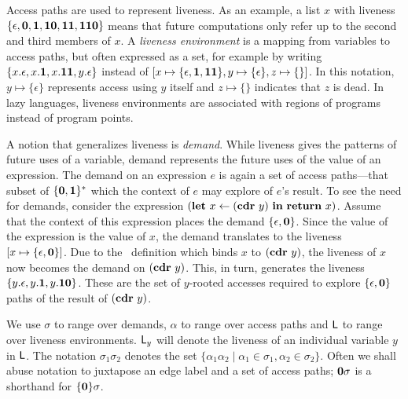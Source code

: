 \documentclass[preprint, 9pt]{sigplanconf}
\begin{document}
Access paths are used to  represent liveness. As an example, a list
$x$ with 
liveness  $\{\epsilon,  \mathbf{0},  \mathbf{1},  \mathbf{1}\mathbf{0},
\mathbf{1}\mathbf{1},  \mathbf{1}\mathbf{1}\mathbf{0}\}$ means that future computations    only
refer up  to the  second and  third members of  $x$.  A  {\em liveness
  environment} is a mapping from  variables to access paths, but often
expressed as  a set,  for example  by writing  $\{x.\epsilon, x.\mathbf{1},
x.\mathbf{1}\mathbf{1},        y.\epsilon\}$        instead        of        $[x
  \mapsto\{\epsilon,\mathbf{1},\mathbf{1}\mathbf{1}\},          y\mapsto\{\epsilon\},
  z\mapsto\{\}]$.    In  this   notation,  $y   \mapsto  \{\epsilon\}$
represents access using $y$ itself and $z \mapsto \{\}$ indicates that
$z$ is dead.  In lazy  languages, liveness environments are associated
with regions of programs instead of program points.

A notion  that generalizes liveness  is {\em demand}.   While liveness
gives the patterns of future uses of a variable, demand represents the
future uses of the value of an expression.  The demand on an expression
$e$   is   again   a   set    of   access   paths---that   subset   of
$\{\mathbf{0},\mathbf{1}\}^\ast$ which the  context of $e$ may  explore of $e$'s
result.   To see  the need  for demands,  consider the expression
$(\mbox{$\mathbf{ let}$}~x\leftarrow  (\mbox{$\mathbf{cdr}$}~y)~\mbox{$\mathbf{ in}$}~   \mbox{$\mathbf{ return}$}~x)$.   Assume   that  the
context of this expression places  the demand $\lbrace \epsilon, \mathbf{0}
\rbrace$. Since the  value of the expression is the  value of $x$, the
demand translates to the liveness  $[x \mapsto \lbrace \epsilon, \mathbf{0}
  \rbrace]$.   Due  to  the  \LET\   definition  which  binds  $x$  to
$(\mbox{$\mathbf{cdr}$}~y)$, the liveness of $x$  now becomes the demand on $(\mbox{$\mathbf{cdr}$}~y)$.
This, in  turn, generates  the liveness $\lbrace  y.\epsilon, y.\mathbf{1},
y.\mathbf{1}\mathbf{0}  \rbrace$.   These are  the  set  of $y$-rooted  accesses
required to  explore $\lbrace  \epsilon, \mathbf{0}  \rbrace$ paths  of the
result of $(\mbox{$\mathbf{cdr}$}~y)$.
  
We use $\sigma$  to range over demands, $\alpha$ to  range over access
paths  and $\mathsf{L}$  to range  over liveness  environments. $\mathsf{L}_y$  will
denote  the liveness  of an  individual  variable $y$  in $\mathsf{L}$.   The
notation $\sigma_1\sigma_2$ denotes  the set $\lbrace \alpha_1\alpha_2
\mid \alpha_1  \in \sigma_1, \alpha_2 \in  \sigma_2\rbrace$.  Often we
shall abuse  notation to juxtapose an  edge label and a  set of access
paths; $\mathbf{0}\sigma$ is a shorthand for $\lbrace\mathbf{0}\rbrace\sigma$.
\end{document}
